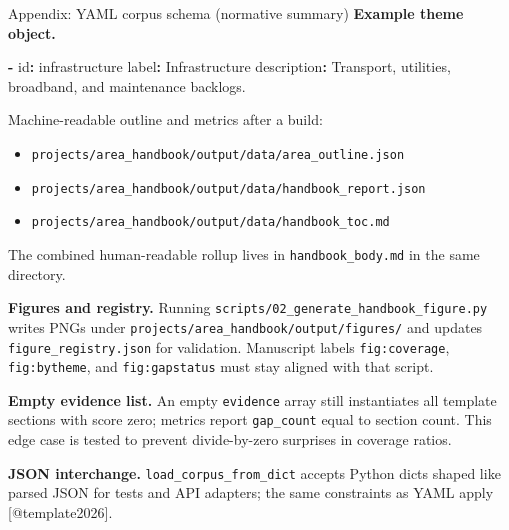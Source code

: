 \documentclass[
  ignorenonframetext,
]{beamer}
\newenvironment{Shaded}{}{}
\newcommand{\AttributeTok}[1]{\textcolor[rgb]{0.49,0.56,0.16}{#1}}
\newcommand{\FunctionTok}[1]{\textcolor[rgb]{0.02,0.16,0.49}{#1}}
\newcommand{\KeywordTok}[1]{\textcolor[rgb]{0.00,0.44,0.13}{\textbf{#1}}}
\providecommand{\tightlist}{%
  \setlength{\itemsep}{0pt}\setlength{\parskip}{0pt}}
\begin{document}
\begin{frame}[fragile]{Appendix: YAML corpus schema (normative summary)}
\textbf{Example theme object.}

\begin{Shaded}
\begin{Highlighting}[]
\KeywordTok{{-}}\AttributeTok{ }\FunctionTok{id}\KeywordTok{:}\AttributeTok{ infrastructure}
\AttributeTok{  }\FunctionTok{label}\KeywordTok{:}\AttributeTok{ Infrastructure}
\AttributeTok{  }\FunctionTok{description}\KeywordTok{:}\AttributeTok{ Transport, utilities, broadband, and maintenance backlogs.}
\end{Highlighting}
\end{Shaded}

Machine-readable outline and metrics after a build:

\begin{itemize}
\tightlist
\item
  \texttt{projects/area\_handbook/output/data/area\_outline.json}
\item
  \texttt{projects/area\_handbook/output/data/handbook\_report.json}
\item
  \texttt{projects/area\_handbook/output/data/handbook\_toc.md}
\end{itemize}

The combined human-readable rollup lives in \texttt{handbook\_body.md}
in the same directory.

\textbf{Figures and registry.} Running
\texttt{scripts/02\_generate\_handbook\_figure.py} writes PNGs under
\texttt{projects/area\_handbook/output/figures/} and updates
\texttt{figure\_registry.json} for validation. Manuscript labels
\texttt{fig:coverage}, \texttt{fig:bytheme}, and \texttt{fig:gapstatus}
must stay aligned with that script.

\textbf{Empty evidence list.} An empty \texttt{evidence} array still
instantiates all template sections with score zero; metrics report
\texttt{gap\_count} equal to section count. This edge case is tested to
prevent divide-by-zero surprises in coverage ratios.

\textbf{JSON interchange.} \texttt{load\_corpus\_from\_dict} accepts
Python dicts shaped like parsed JSON for tests and API adapters; the
same constraints as YAML apply {[}@template2026{]}.
\end{frame}
\end{document}
